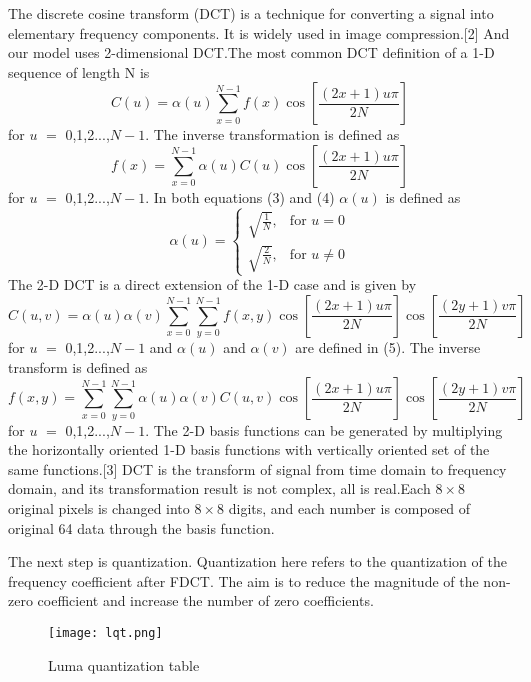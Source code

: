 \documentclass{mcmthesis}
\begin{document}
The discrete cosine transform (DCT) is a technique for converting a signal into elementary frequency components. It is widely used in image compression.[2] And our model uses 2-dimensional DCT.The most common DCT definition of a 1-D sequence of length N is 
\begin{equation}
  C(u)=\alpha(u)\sum_{x=0}^{N-1}f(x)\cos\left[\frac{(2x+1)u\pi}{2N}\right]
\end{equation}
for $u$ $=$ 0,1,2...,$N-1$. The inverse transformation is defined as
\begin{equation}
  f(x)=\sum_{x=0}^{N-1}\alpha(u)C(u)\cos\left[\frac{(2x+1)u\pi}{2N}\right]
\end{equation}
for $u$ $=$ 0,1,2...,$N-1$. In both equations (3) and (4) $\alpha(u)$ is defined as 
\begin{equation}
  \alpha(u)=\begin{cases}\sqrt{\frac1N},&\text{for }u=0\\
    \sqrt{\frac2N},&\text{for } u\not= 0
    \end{cases}
\end{equation}
The 2-D DCT is a direct extension of the 1-D case and is given by
\begin{equation}
  C(u,v) = \alpha(u)\alpha(v)\sum_{x=0}^{N-1}\sum_{y=0}^{N-1}f(x,y)\cos\left[\frac{(2x+1)u\pi}{2N}\right]\cos\left[\frac{(2y+1)v\pi}{2N}\right]
\end{equation}
for $u$ $=$ 0,1,2...,$N-1$ and $\alpha(u)$ and $\alpha(v)$ are defined in (5). The inverse transform is defined as 
\begin{equation}
  f(x,y) = \sum_{x=0}^{N-1}\sum_{y=0}^{N-1}\alpha(u)\alpha(v)C(u,v)\cos\left[\frac{(2x+1)u\pi}{2N}\right]\cos\left[\frac{(2y+1)v\pi}{2N}\right]
\end{equation}
for $u$ $=$ 0,1,2...,$N-1$. The 2-D basis functions can be generated by multiplying the horizontally oriented 1-D basis functions with vertically oriented set of the same functions.[3] DCT is the transform of signal from time domain to frequency domain, and its transformation result is not complex, all is real.Each $8\times8$ original pixels is changed into $8\times8$ digits, and each number is composed of original 64 data through the basis function.

The next step is quantization. Quantization here refers to the quantization of the frequency coefficient after FDCT. The aim is to reduce the magnitude of the non-zero coefficient and increase the number of zero coefficients.

\begin{figure}[h]
\centering
\texttt{[image: lqt.png]}
\caption{Luma quantization table} \label{fig: Luma quantization table}
\end{figure} 
\end{document}

